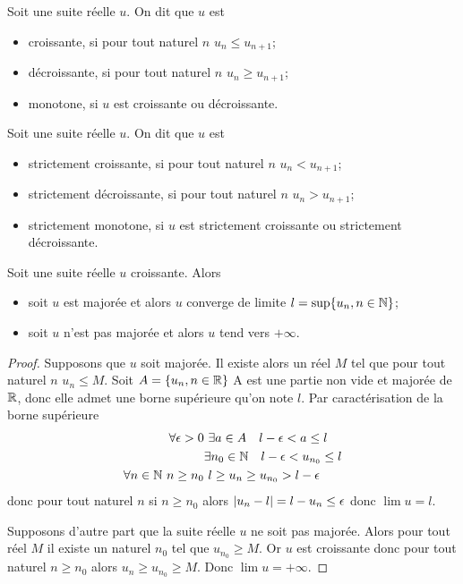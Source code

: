 \begin{defdef}
  Soit une suite réelle $u$. On dit que $u$ est
  \begin{itemize}
  \item croissante, si pour tout naturel $n$ $u_n \leq u_{n+1}$;
  \item décroissante, si pour tout naturel $n$ $u_n \geq u_{n+1}$;
  \item monotone, si $u$ est croissante ou décroissante.
  \end{itemize}
\end{defdef}
\begin{defdef}
  Soit une suite réelle $u$. On dit que $u$ est
  \begin{itemize}
  \item strictement croissante, si pour tout naturel $n$ $u_n < u_{n+1}$;
  \item strictement décroissante, si pour tout naturel $n$ $u_n > u_{n+1}$;
  \item strictement monotone, si $u$ est strictement croissante ou strictement décroissante.
  \end{itemize}
\end{defdef}
\begin{theo}
  Soit une suite réelle $u$ croissante. Alors
  \begin{itemize}
  \item soit $u$ est majorée et alors $u$ converge de limite $l=\sup\{u_n, n \in \mathbb{N}\}$;
  \item soit $u$ n'est pas majorée et alors $u$ tend vers $+\infty$.
  \end{itemize}
\end{theo}
\begin{proof}
  Supposons que $u$ soit majorée. Il existe alors un réel $M$ tel que pour tout naturel $n$ $u_n \leq M$. Soit $A=\{u_n, n \in \mathbb{R}\}$ A est une partie non vide et majorée de $\mathbb{R}$, donc elle admet une borne supérieure qu'on note $l$. Par caractérisation de la borne supérieure
  \begin{align}
    \forall \epsilon > 0 & \ \exists a \in A \quad l-\epsilon < a \leq l \\
    & \exists n_0 \in \mathbb{N} \quad l-\epsilon < u_{n_0} \leq l \\
    \forall n \in \mathbb{N} \ n \geq n_0 & \ l \geq u_n \geq u_{n_0} > l-\epsilon
  \end{align}
donc pour tout naturel $n$ si $n \geq n_0$ alors $\left\lvert u_n-l\right\rvert=l-u_n \leq \epsilon$ donc $\lim u =l$.

Supposons d'autre part que la suite réelle $u$ ne soit pas majorée. Alors pour tout réel $M$ il existe un naturel $n_0$ tel que $u_{n_0} \geq M$. Or $u$ est croissante donc pour tout naturel $n \geq n_0$ alors $u_n \geq u_{n_0} \geq M$. Donc $\lim u =+\infty$.
\end{proof}
